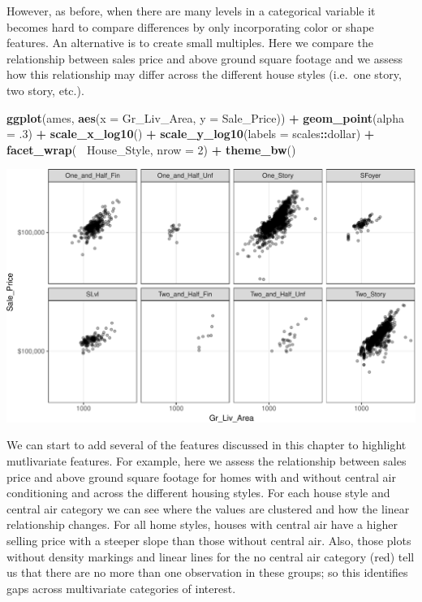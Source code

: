 \documentclass[]{article}
\newenvironment{Shaded}{\begin{snugshade}}{\end{snugshade}}
\newcommand{\KeywordTok}[1]{\textcolor[rgb]{0.13,0.29,0.53}{\textbf{#1}}}
\newcommand{\DataTypeTok}[1]{\textcolor[rgb]{0.13,0.29,0.53}{#1}}
\newcommand{\DecValTok}[1]{\textcolor[rgb]{0.00,0.00,0.81}{#1}}
\newcommand{\StringTok}[1]{\textcolor[rgb]{0.31,0.60,0.02}{#1}}
\newcommand{\OperatorTok}[1]{\textcolor[rgb]{0.81,0.36,0.00}{\textbf{#1}}}
\newcommand{\NormalTok}[1]{#1}
\begin{document}
However, as before, when there are many levels in a categorical variable
it becomes hard to compare differences by only incorporating color or
shape features. An alternative is to create small multiples. Here we
compare the relationship between sales price and above ground square
footage and we assess how this relationship may differ across the
different house styles (i.e.~one story, two story, etc.).

\begin{Shaded}
\begin{Highlighting}[]
\KeywordTok{ggplot}\NormalTok{(ames, }\KeywordTok{aes}\NormalTok{(}\DataTypeTok{x =}\NormalTok{ Gr_Liv_Area, }\DataTypeTok{y =}\NormalTok{ Sale_Price)) }\OperatorTok{+}
\StringTok{  }\KeywordTok{geom_point}\NormalTok{(}\DataTypeTok{alpha =}\NormalTok{ .}\DecValTok{3}\NormalTok{) }\OperatorTok{+}
\StringTok{  }\KeywordTok{scale_x_log10}\NormalTok{() }\OperatorTok{+}
\StringTok{  }\KeywordTok{scale_y_log10}\NormalTok{(}\DataTypeTok{labels =}\NormalTok{ scales}\OperatorTok{::}\NormalTok{dollar) }\OperatorTok{+}
\StringTok{  }\KeywordTok{facet_wrap}\NormalTok{(}\OperatorTok{~}\StringTok{ }\NormalTok{House_Style, }\DataTypeTok{nrow =} \DecValTok{2}\NormalTok{) }\OperatorTok{+}
\StringTok{  }\KeywordTok{theme_bw}\NormalTok{()}
\end{Highlighting}
\end{Shaded}

\begin{center}\includegraphics{Chapter_3_-_Visualization_files/figure-latex/smallmulti-1} \end{center}

We can start to add several of the features discussed in this chapter to
highlight mutlivariate features. For example, here we assess the
relationship between sales price and above ground square footage for
homes with and without central air conditioning and across the different
housing styles. For each house style and central air category we can see
where the values are clustered and how the linear relationship changes.
For all home styles, houses with central air have a higher selling price
with a steeper slope than those without central air. Also, those plots
without density markings and linear lines for the no central air
category (red) tell us that there are no more than one observation in
these groups; so this identifies gaps across multivariate categories of
interest.
\end{document}
